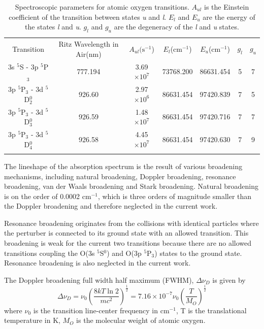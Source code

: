 \documentclass[12pt]{iopart}
\begin{document}
\begin{table}
\centering
\caption{Spectroscopic parameters for atomic oxygen transitions\cite{nist_o_lines}. $A_{ul}$ is the Einstein coefficient of the transition between states \textit{u} and \textit{l}.  $E_l$ and  $E_u$ are the energy of the states \textit{l} and \textit{u}.  $g_l$ and $g_u$ are the degeneracy of the \textit{l} and \textit{u} states.  }
\label{tab:Spectroscopic paprameters}       %
\begin{tabular}{ccccccc}
\hline\noalign{\smallskip}
Transition & Ritz Wavelength in Air(nm) & $A_{ul}( \textrm{s}^{-1}$)  & $E_l$(cm$^{-1}$)   & $E_u$(cm$^{-1}$)  & $g_l$ & $g_u$\\
\noalign{\smallskip}\hline\noalign{\smallskip}
3s $^5$S - 3p $^5$P$_{3}$ &777.194 & 3.69 $\times10^7$  &73768.200   &86631.454  &5  &7  \\
3p $^5$P$_{3}$ - 3d $^5$D$_{2}^0$  & 926.60 &2.97 $\times10^6$ & 86631.454   &97420.839  &7  &5\\
3p $^5$P$_{3}$ - 3d $^5$D$_{3}^0$ &926.59 & 1.48 $\times10^7$ & 86631.454    &97420.716   &7  &7\\
3p $^5$P$_{3}$ - 3d $^5$D$_{4}^0$ &926.58   & 4.45$\times10^7$  & 86631.454   &97420.630 	  &7  &9  \\
\noalign{\smallskip}\hline
\end{tabular}
\end{table}

The lineshape of the absorption spectrum is the result of various broadening mechanisms, including natural broadening, Doppler broadening, resonance broadening, van der Waals broadening and Stark broadening\cite{Laux2003}.
Natural broadening is on the order of 0.0002 cm$^{-1}$, which is three orders of magnitude smaller than the Doppler broadening and therefore neglected in the current work.

Resonance broadening originates from the collisions with identical particles where the perturber is connected to its ground state with an allowed transition\cite{Griem1964}. This broadening is weak for the current two transitions because there are no allowed transitions coupling the O(3s $^5$S$^0$) and O(3p $^5$P$_{3}$) states to the ground state. Resonance broadening is also neglected in the current work.

The Doppler broadening full width half maximum (FWHM), $\Delta \nu_{D}$ is given by\cite{Hanson2016}
\begin{equation}
    \label{eq:doppler_width}
    \Delta \nu_{D} = \nu_0 (\frac{8kT\ln 2}{mc^2})^{\frac{1}{2}}
     = 7.16\times10^{-7} \nu_0 (\frac{T}{M_O})^{\frac{1}{2}}
\end{equation}
where $\nu_0$ is the transition line-center frequency in cm$^{-1}$, T is the translational temperature in K, $M_O$ is the molecular weight of atomic oxygen. 
\end{document}
